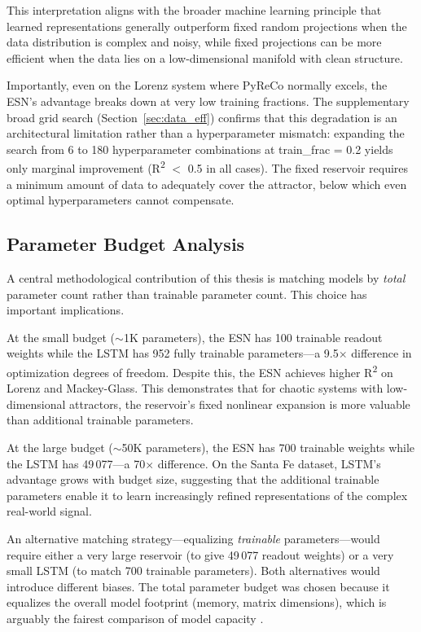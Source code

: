 This interpretation aligns with the broader machine learning principle that learned representations generally outperform fixed random projections when the data distribution is complex and noisy, while fixed projections can be more efficient when the data lies on a low-dimensional manifold with clean structure.

Importantly, even on the Lorenz system where PyReCo normally excels, the ESN's advantage breaks down at very low training fractions. The supplementary broad grid search (Section~\ref{sec:data_eff}) confirms that this degradation is an architectural limitation rather than a hyperparameter mismatch: expanding the search from 6 to 180 hyperparameter combinations at train\_frac = 0.2 yields only marginal improvement (R\textsuperscript{2} $<$ 0.5 in all cases). The fixed reservoir requires a minimum amount of data to adequately cover the attractor, below which even optimal hyperparameters cannot compensate.

\subsection{Parameter Budget Analysis}
\label{sec:budget_discussion}

A central methodological contribution of this thesis is matching models by \emph{total} parameter count rather than trainable parameter count. This choice has important implications.

At the small budget (${\sim}$1K parameters), the ESN has 100 trainable readout weights while the LSTM has 952 fully trainable parameters---a 9.5$\times$ difference in optimization degrees of freedom. Despite this, the ESN achieves higher R\textsuperscript{2} on Lorenz and Mackey-Glass. This demonstrates that for chaotic systems with low-dimensional attractors, the reservoir's fixed nonlinear expansion is more valuable than additional trainable parameters.

At the large budget (${\sim}$50K parameters), the ESN has 700 trainable weights while the LSTM has 49\,077---a 70$\times$ difference. On the Santa Fe dataset, LSTM's advantage grows with budget size, suggesting that the additional trainable parameters enable it to learn increasingly refined representations of the complex real-world signal.

An alternative matching strategy---equalizing \emph{trainable} parameters---would require either a very large reservoir (to give 49\,077 readout weights) or a very small LSTM (to match 700 trainable parameters). Both alternatives would introduce different biases. The total parameter budget was chosen because it equalizes the overall model footprint (memory, matrix dimensions), which is arguably the fairest comparison of model capacity \cite{wringe2025benchmarks}.

